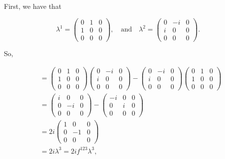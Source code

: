 \section{}

First, we have that

\begin{equation}
  \lambda^1 = \begin{pmatrix}0 & 1 & 0 \\ 1 & 0 & 0 \\ 0 & 0 & 0\end{pmatrix}, \quad\mathrm{and}\quad \lambda^2 = \begin{pmatrix}0 & -i & 0 \\ i & 0 & 0 \\ 0 & 0 & 0\end{pmatrix}.
\end{equation}

So,

\begin{align}
  [\lambda^1,\lambda^2] &= \begin{pmatrix}0 & 1 & 0 \\ 1 & 0 & 0 \\ 0 & 0 & 0\end{pmatrix}\begin{pmatrix}0 & -i & 0 \\ i & 0 & 0 \\ 0 & 0 & 0\end{pmatrix} - \begin{pmatrix}0 & -i & 0 \\ i & 0 & 0 \\ 0 & 0 & 0\end{pmatrix}\begin{pmatrix}0 & 1 & 0 \\ 1 & 0 & 0 \\ 0 & 0 & 0\end{pmatrix} \\
                        &= \begin{pmatrix}i & 0 & 0 \\ 0 & -i & 0 \\ 0 & 0 & 0\end{pmatrix} - \begin{pmatrix}-i & 0 & 0 \\ 0 & i & 0 \\ 0 & 0 & 0\end{pmatrix} \\
                        &= 2i \begin{pmatrix}1 & 0 & 0 \\ 0 & -1 & 0 \\ 0 & 0 & 0\end{pmatrix} \\
  &= 2i\lambda^3 = 2if^{123}\lambda^3,
\end{align}

